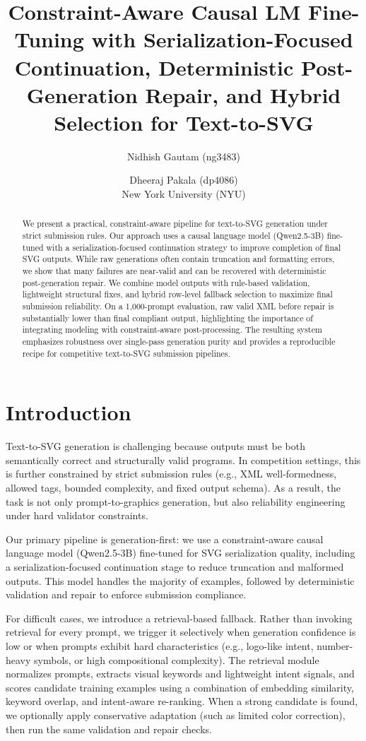 \documentclass[11pt]{article}
\title{Constraint-Aware Causal LM Fine-Tuning with Serialization-Focused Continuation, Deterministic Post-Generation Repair, and Hybrid Selection for Text-to-SVG}
\author{Nidhish Gautam (ng3483) \and Dheeraj Pakala (dp4086) \\
New York University (NYU)}
\begin{document}
\maketitle

\begin{abstract}
We present a practical, constraint-aware pipeline for text-to-SVG generation under strict submission rules.
Our approach uses a causal language model (Qwen2.5-3B) fine-tuned with a serialization-focused continuation strategy to improve completion of final SVG outputs.
While raw generations often contain truncation and formatting errors, we show that many failures are near-valid and can be recovered with deterministic post-generation repair.
We combine model outputs with rule-based validation, lightweight structural fixes, and hybrid row-level fallback selection to maximize final submission reliability.
On a 1,000-prompt evaluation, raw valid XML before repair is substantially lower than final compliant output, highlighting the importance of integrating modeling with constraint-aware post-processing.
The resulting system emphasizes robustness over single-pass generation purity and provides a reproducible recipe for competitive text-to-SVG submission pipelines.
\end{abstract}

\section{Introduction}
Text-to-SVG generation is challenging because outputs must be both semantically correct and structurally valid programs.
In competition settings, this is further constrained by strict submission rules (e.g., XML well-formedness, allowed tags, bounded complexity, and fixed output schema).
As a result, the task is not only prompt-to-graphics generation, but also reliability engineering under hard validator constraints.

Our primary pipeline is generation-first: we use a constraint-aware causal language model (Qwen2.5-3B) fine-tuned for SVG serialization quality, including a serialization-focused continuation stage to reduce truncation and malformed outputs.
This model handles the majority of examples, followed by deterministic validation and repair to enforce submission compliance.

For difficult cases, we introduce a retrieval-based fallback.
Rather than invoking retrieval for every prompt, we trigger it selectively when generation confidence is low or when prompts exhibit hard characteristics (e.g., logo-like intent, number-heavy symbols, or high compositional complexity).
The retrieval module normalizes prompts, extracts visual keywords and lightweight intent signals, and scores candidate training examples using a combination of embedding similarity, keyword overlap, and intent-aware re-ranking.
When a strong candidate is found, we optionally apply conservative adaptation (such as limited color correction), then run the same validation and repair checks.
\end{document}

